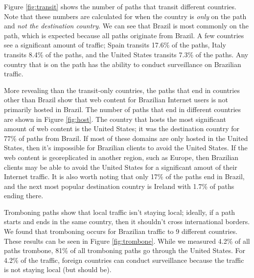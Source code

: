 Figure \ref{fig:transit} shows the number of paths that transit different countries.  Note that these numbers are calculated for when the country is \textit{only} on the path and \textit{not the destination country}.  We can see that Brazil is most commonly on the path, which is expected because all paths originate from Brazil.  A few countries see a significant amount of traffic; Spain transits 17.6\% of the paths, Italy transits 8.4\% of the paths, and the United States transits 7.3\% of the paths.  Any country that is on the path has the ability to conduct surveillance on Brazilian traffic.  

More revealing than the transit-only countries, the paths that end in countries other than Brazil show that web content for Brazilian Internet users is not primarily hosted in Brazil.  The number of paths that end in different countries are shown in Figure \ref{fig:host}.  The country that hosts the most significant amount of web content is the United States; it was the destination country for 77\% of paths from Brazil.  If most of these domains are only hosted in the United States, then it's impossible for Brazilian clients to avoid the United States.  If the web content is georeplicated in another region, such as Europe, then Brazilian clients may be able to avoid the United States for a significant amout of their Internet traffic.  It is also worth noting that only 17\% of the paths end in Brazil, and the next most popular destination country is Ireland with 1.7\% of paths ending there.  

Tromboning paths show that local traffic isn't staying local; ideally, if a path starts and ends in the same country, then it shouldn't cross international borders.  We found that tromboning occurs for Brazilian traffic to 9 different countries.  These results can be seen in Figure \ref{fig:trombone}.  While we measured 4.2\% of all paths trombone, 81\% of all tromboning paths go through the United States.  For 4.2\% of the traffic, foreign countries can conduct surveillance because the traffic is not staying local (but should be). 



